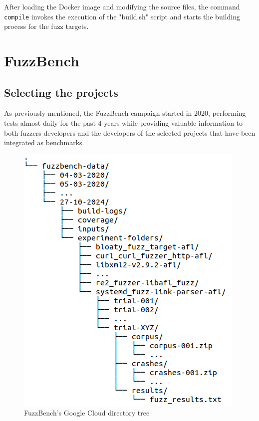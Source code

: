 After loading the Docker image and modifying the source files, the command \verb|compile| invokes the execution of the "build.sh" script and starts the building process for the fuzz targets.













\newpage
\section{FuzzBench}
\subsection{Selecting the projects}
As previously mentioned, the FuzzBench campaign started in 2020, performing tests almost daily for the past 4 years while providing valuable information to both fuzzers developers and the developers of the selected projects that have been integrated as benchmarks.
\begin{figure}[h]
\centering
\includegraphics[scale=0.4]{foto/tree.png}
\caption{FuzzBench's Google Cloud directory tree}
\label{fig:tree}
\end{figure}
\ \\
